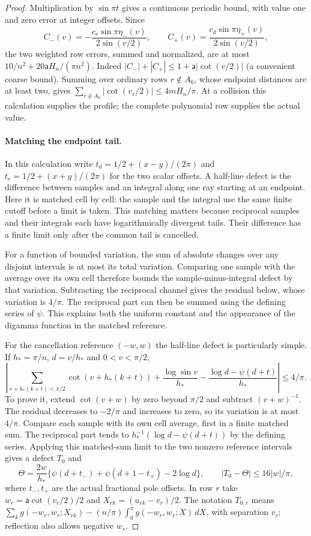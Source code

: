 \begin{proof}
Multiplication by $\sin\pi t$ gives a continuous periodic bound,
with value one and zero error at integer offsets. Since
\[
 C_-(v)=-\frac{c_e\sin\pi\eta_-(v)}{2\sin(v/2)},\qquad
 C_+(v)= \frac{c_d\sin\pi\eta_+(v)}{2\sin(v/2)},
\]
the two weighted row errors, summed and normalized, are at most
$10/n^2+20\mathsf{a}H_n/(\pi n^2)$. Indeed
$|C_-|+|C_+|\leq1+\mathsf{a}|\cot(v/2)|$ (a convenient coarse bound).
Summing over ordinary rows $r\notin A_6$, whose endpoint distances
are at least two, gives $\sum_{r\notin A_6}|\cot(v_r/2)|\leq4mH_n/\pi$.
At a collision this calculation supplies the profile; the complete
polynomial row supplies the actual value.

\paragraph{Matching the endpoint tail.}
In this calculation write $t_d=1/2+(x-y)/(2\pi)$ and
$t_e=1/2+(x+y)/(2\pi)$ for the two scalar offsets.
A half-line defect is the difference between samples and an integral
along one ray starting at an endpoint. Here it is matched cell by cell:
the sample and the integral use the same finite cutoff before a limit
is taken. This matching matters because reciprocal samples and their
integrals each have logarithmically divergent tails. Their difference
has a finite limit only after the common tail is cancelled.

For a function of bounded variation, the sum of absolute changes over
any disjoint intervals is at most its total variation. Comparing one
sample with the average over its own cell therefore bounds the
sample-minus-integral defect by that variation. Subtracting the
reciprocal channel gives the residual below, whose variation is
$4/\pi$. The reciprocal part can then be summed using the defining
series of $\psi$. This explains both the uniform constant and the
appearance of the digamma function in the matched reference.

For the cancellation reference $(-w,w)$ the half-line defect is
particularly simple. If $h_*=\pi/n$, $d=v/h_*$ and $0<v<\pi/2$,
\[
 \left|\sum_{v+h_*(k+t)<\pi/2}\cot(v+h_*(k+t))
       +\frac{\log\sin v}{h_*}
       -\frac{\log d-\psi(d+t)}{h_*}\right|\leq4/\pi.
\]
To prove it, extend $\cot(v+w)$ by zero beyond $\pi/2$ and subtract
$(v+w)^{-1}$. The residual decreases to $-2/\pi$ and increases to
zero, so its variation is at most $4/\pi$. Compare each sample with
its own cell average, first in a finite matched sum. The reciprocal
part tends to $h_*^{-1}(\log d-\psi(d+t))$ by the defining series.
Applying this matched-sum limit to the two
nonzero reference intervals gives a defect $T_0$ and
\begin{equation}\label{uc:halfline}
 \Theta=\frac{2w}{h_*}
 \{\psi(d+t_-)+\psi(d+1-t_+)-2\log d\},
 \qquad |T_0-\Theta|\leq16|w|/\pi,
\end{equation}
where $t_-,t_+$ are the actual fractional pole offsets.
In row $r$ take $w_r=\mathsf{a}\cot(v_r/2)/2$ and
$X_{rk}=(u_{rk}-v_r)/2$. The notation $T_{0,r}$ means
$\sum_k g(-w_r,w_r;X_{rk})-(n/\pi)\int_0^\pi
g(-w_r,w_r;X)\,dX$, with separation $v_r$;
reflection also allows negative $w_r$.


\end{proof}
